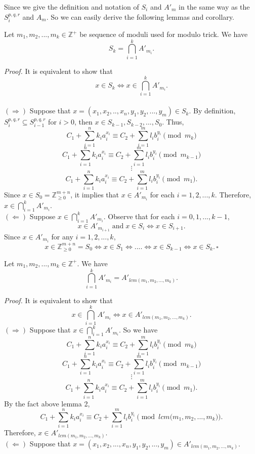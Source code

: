 \documentclass[12pt]{article}
\begin{document}
\hspace{0.5cm}Since we give the definition and notation of $S_i$ and $A'_m$ in the same way as the $S_i^{p,q,r}$ and $A_m$. So we can easily derive the following lemmas and corollary.

\begin{lemma} Let $m_1,m_2,...,m_k\in \mathbb{Z}^+$ be sequence of moduli used for modulo trick. We have
    \[S_k = \bigcap_{i=1}^k A'_{m_i}.\]
\end{lemma}
\noindent
\textit{Proof.} It is equivalent to show that \[x\in S_k \iff x \in \bigcap_{i=1}^kA'_{m_i}.\] \\
$(\Rightarrow)$ Suppose that $x = (x_1,x_2,..,x_n,y_1,y_2,...,y_m)\in S_k$. By definition, $S^{p,q,r}_i \subseteq S^{p,q,r}_{i-1}$ for $i>0$, then $x \in S_{k-1}, S_{k-2},...,S_0$. Thus,
\[    C_1+ \sum_{i=1}^nk_ia_i^{x_i} \equiv C_2 + \sum_{i=1}^ml_ib_i^{y_i} \pmod {m_k}\]
\[    C_1+ \sum_{i=1}^nk_ia_i^{x_i} \equiv C_2 + \sum_{i=1}^ml_ib_i^{y_i} \pmod {m_{k-1}}\]
\[\vdots\]
\[    C_1+ \sum_{i=1}^nk_ia_i^{x_i} \equiv C_2 + \sum_{i=1}^ml_ib_i^{y_i} \pmod {m_{1}}.\]
Since $x\in S_0 = \mathbb{Z}_{\geq0}^{m+n}$, it implies that $x\in A'_{m_i} $ for each $i=1,2,...,k$. Therefore, $x\in \bigcap_{i=1}^kA'_{m_i}$.\\
$(\Leftarrow)$ Suppose $x \in \bigcap_{i=1}^k A'_{m_i}$. Observe that for each $i=0,1,...,k-1$,
\[ x\in A'_{m_{i+1}}\; \text{and} \; x\in S_{i} \iff  x \in S_{i+1}.\]
Since $x\in A'_{m_i} $ for any $i=1,2,...,k$,
\[x\in  \mathbb{Z}^{m+n}_{\geq0} = S_0 \iff x\in S_{1} \iff ....\iff x\in S_{k-1} \iff  x \in  S_{k}. \, \square \]
\newpage
\begin{lemma} Let $m_1,m_2,...,m_k \in \mathbb{Z}^+$. We have
\[\bigcap_{i=1}^kA'_{m_i} = A'_{lcm(m_1,m_2,...,m_k)}.\]
\end{lemma} 
\noindent
\textit{Proof.} It is equivalent to show that \[x\in \bigcap_{i=1}^kA'_{m_i} \iff x\in A'_{lcm(m_1,m_2,...,m_k)}.\]
$(\Rightarrow)$ Suppose that $x \in \bigcap_{i=1}^k A'_{m_i}$. So we have
\[    C_1+ \sum_{i=1}^nk_ia_i^{x_i} \equiv C_2 + \sum_{i=1}^ml_ib_i^{y_i} \pmod {m_k}\]
\[    C_1+ \sum_{i=1}^nk_ia_i^{x_i} \equiv C_2 + \sum_{i=1}^ml_ib_i^{y_i} \pmod {m_{k-1}}\]
\[\vdots\]
\[    C_1+ \sum_{i=1}^nk_ia_i^{x_i} \equiv C_2 + \sum_{i=1}^ml_ib_i^{y_i} \pmod {m_{1}}.\]
By the fact above lemma 2, 
\[    C_1+ \sum_{i=1}^nk_ia_i^{x_i} \equiv C_2 + \sum_{i=1}^ml_ib_i^{y_i} \pmod {lcm(m_1,m_2,...,m_k}).\]
Therefore, $x \in A'_{lcm(m_1,m_2,...,m_k)}$.\\
$(\Leftarrow)$ Suppose that $x= (x_1,x_2,...,x_n,y_1,y_2,...,y_m) \in A'_{lcm(m_1,m_2,...,m_k)}$. \\
\end{document}
